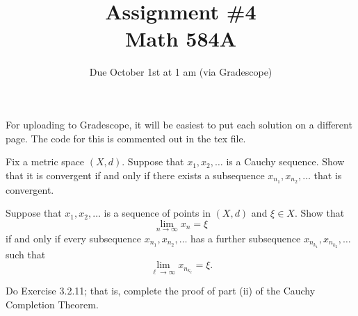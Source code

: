 \documentclass[11pt,letterpaper]{article}
\title{Assignment \#4\\Math 584A}
\author{
	}
\date{Due October 1st at 1 am (via Gradescope)}
\newenvironment{prob}[1]
  {\renewcommand\theinnerprob{#1}\innerprob}
  {\endinnerprob}
\newenvironment{solution}
  {\renewcommand\qedsymbol{}\begin{proof}[Solution]}
  {\end{proof}\bigskip}
\begin{document}
\maketitle

For uploading to Gradescope, it will be easiest to put each solution on a different page.  The code for this is commented out in the tex file.









\begin{prob}{1}  %
Fix a metric space $(X,d)$.  Suppose that $x_1,x_2,\dots$ is a Cauchy sequence.  Show that it is convergent if and only if there exists a subsequence $x_{n_1}, x_{n_2},\dots$ that is convergent.
\end{prob}



\begin{prob}{2}  %
Suppose that $x_1, x_2,\dots$ is a sequence of points in $(X,d)$ and $\xi \in X$.  Show that
\[
	\lim_{n\to\infty} x_n = \xi
\]
if and only if every subsequence $x_{n_1},x_{n_2},\dots$ has a further subsequence $x_{n_{k_1}}, x_{n_{k_2}}, \dots$ such that
\[
	\lim_{\ell\to\infty} x_{n_{k_\ell}} = \xi.
\]
\end{prob}





\begin{prob}{3}  %
Do Exercise 3.2.11; that is, complete the proof of part (ii) of the Cauchy Completion Theorem.
 \end{prob}
\end{document}
